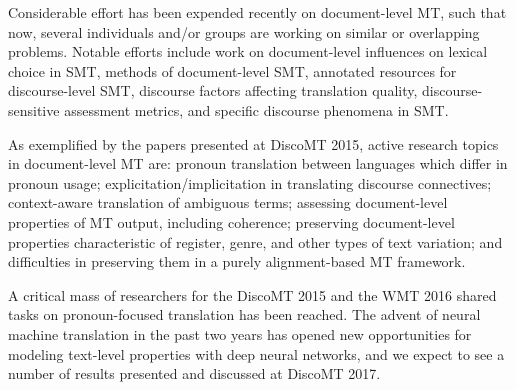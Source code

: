 \documentclass[11pt]{article}
\begin{document}
Considerable effort has been expended recently on document-level MT, such that now, several
individuals and/or groups are working on similar or overlapping problems.
Notable efforts include work on document-level influences on lexical choice in SMT, methods of document-level
SMT, annotated resources for discourse-level SMT, discourse factors affecting translation quality,
discourse-sensitive assessment metrics, and specific discourse phenomena in SMT.

As exemplified by the papers presented at DiscoMT 2015, active research topics in document-level MT are: 
pronoun translation between languages which differ in pronoun usage; 
explicitation/implicitation in translating discourse connectives; 
context-aware translation of ambiguous terms; assessing document-level properties of MT
output, including coherence; preserving document-level
properties characteristic of register, genre, and other types of text variation; and difficulties 
in preserving them in a purely alignment-based MT framework.

A critical mass of researchers for the DiscoMT 2015 and the WMT 2016 shared tasks
on pronoun-focused translation has been reached.  The advent of neural machine 
translation in the past two years has opened new opportunities for modeling 
text-level properties with deep neural networks, and we expect to see a number
of results presented and discussed at DiscoMT 2017.




\end{document}
